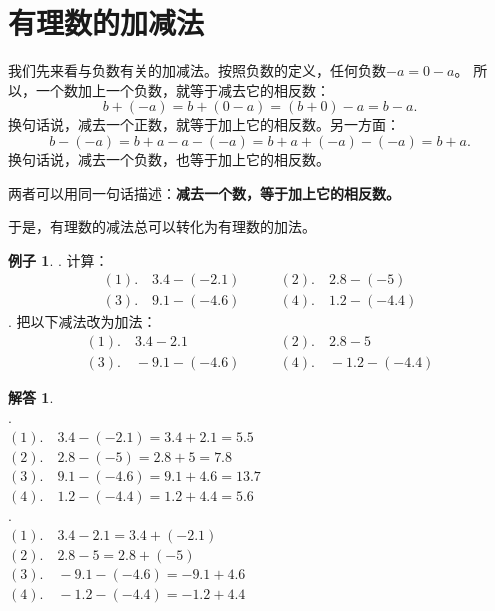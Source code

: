 \documentclass[12pt,UTF8]{ctexbook}
\theoremstyle{definition}
\newtheorem{ex}{例子}[section]
\newtheorem*{so}{解答}
\theoremstyle{plain}
\begin{document}
\section{有理数的加减法}
我们先来看与负数有关的加减法。按照负数的定义，任何负数$-a = 0 - a$。
所以，一个数加上一个负数，就等于减去它的相反数：
$$ b + (-a) = b + (0 - a) = (b + 0) - a = b - a.$$
换句话说，减去一个正数，就等于加上它的相反数。另一方面：
$$ b - (-a) = b + a - a - (-a) = b + a + (-a) - (-a) = b + a.$$
换句话说，减去一个负数，也等于加上它的相反数。

两者可以用同一句话描述：\textbf{减去一个数，等于加上它的相反数。}

\begin{center}
\end{center}

于是，有理数的减法总可以转化为有理数的加法。

\begin{ex}
    . 计算：
    $$
    \begin{array}{ll}
        (1). \quad 3.4 - (-2.1) \quad & \quad (2). \quad 2.8 - (-5) \\
        (3). \quad 9.1 - (-4.6) \quad & \quad (4). \quad 1.2 - (-4.4) 
    \end{array}
    $$
    . 把以下减法改为加法：
    $$
    \begin{array}{ll}
        (1). \quad 3.4 - 2.1 \quad & \quad (2). \quad 2.8 - 5 \\
        (3). \quad -9.1 - (-4.6) \quad & \quad (4). \quad -1.2 - (-4.4) 
    \end{array}
    $$

\end{ex}
\begin{so}
    \mbox{}\\
    . \\
    \indent $(1). \quad 3.4 - (-2.1) = 3.4 + 2.1 = 5.5$ \\
    \indent $(2). \quad 2.8 - (-5) = 2.8 + 5 = 7.8$ \\
    \indent $(3). \quad 9.1 - (-4.6) = 9.1 + 4.6 = 13.7$ \\
    \indent $(4). \quad 1.2 - (-4.4) = 1.2 + 4.4 = 5.6$ \\
    . \\
    \indent $(1). \quad 3.4 - 2.1 = 3.4 + (-2.1)$ \\
    \indent $(2). \quad 2.8 - 5 = 2.8 + (-5)$ \\
    \indent $(3). \quad -9.1 - (-4.6) = -9.1 + 4.6$ \\
    \indent $(4). \quad -1.2 - (-4.4) = -1.2 + 4.4$ 
\end{so}
\end{document}
